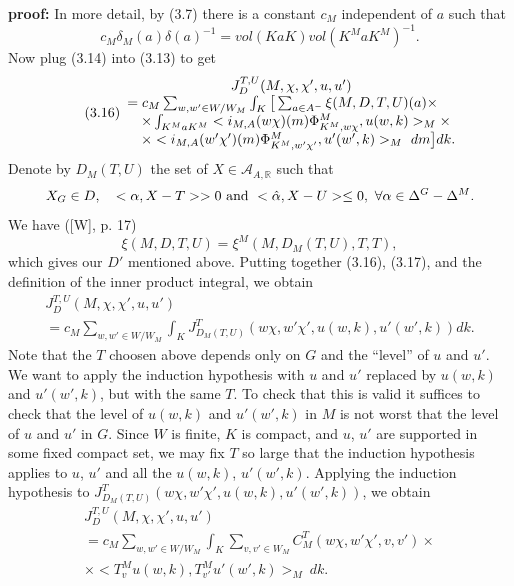 \documentclass[12pt]{article}
\newenvironment{pf}[1][proof:]{\par\medskip\noindent\textbf{#1} }{\par\medskip}
\begin{document}
\begin{pf}
In more detail, by (3.7) there is a constant $c_M$ independent of $a$ such that
\[
c_M\delta_M(a)\delta(a)^{-1}=vol(KaK)vol(K^MaK^M)^{-1}.
\]
Now plug (3.14) into (3.13) to get
\begin{equation}\tag{3.16}
\begin{array}{l}
\multicolumn{1}{c}{J^{T,U}_D(M,\chi,\chi',u,u')}\\
=c_M\sum_{w,w'\in W/W_M}\int_K\big[\sum_{a\in A^-}\xi(M,D,T,U)(a)\times\\
\quad\times\int_{K^MaK^M}<i_{M,A}(w\chi)(m)\Phi^M_{K^M,w\chi},u(w,k)>_M\times\\
\quad\times<i_{M,A}(w'\chi')(m)\Phi^M_{K^M,w'\chi'},u'(w',k)>_M\ dm\big]dk.
\end{array}
\end{equation}
Denote by $D_M(T,U)$ the set of $X\in\mathcal{A}_{A,\mathbb{R}}$ such that
\[
X_G\in D,\quad<\alpha,X-T>>0\ {\rm and}\ <\hat\alpha,X-U>\leq0,\ \forall\alpha\in\Delta^G-\Delta^M.
\]
We have ([W], p. 17)
\begin{equation}\tag{3.17}
\xi(M,D,T,U)=\xi^M(M,D_M(T,U),T,T),
\end{equation}
which gives our $D'$ mentioned above. Putting together (3.16), (3.17), and the definition of the inner product integral, we obtain
\[
\begin{array}{c}
J^{T,U}_D(M,\chi,\chi',u,u')\\
=c_M\sum_{w,w'\in W/W_M}\int_KJ^T_{D_M(T,U)}(w\chi,w'\chi',u(w,k),u'(w',k))dk.
\end{array}
\]
Note that the $T$ choosen above depends only on $G$ and the ``level'' of $u$ and $u'$. We want to apply the induction hypothesis with $u$ and $u'$ replaced by $u(w,k)$ and $u'(w',k)$, but with the same $T$. To check that this is valid it suffices to check that the level of $u(w,k)$ and $u'(w',k)$ in $M$ is not worst that the level of $u$ and $u'$ in $G$. Since $W$ is finite, $K$ is compact, and $u$, $u'$ are supported in some fixed compact set, we may fix $T$ so large that the induction hypothesis applies to $u$, $u'$ and all the $u(w,k)$, $u'(w',k)$. Applying the induction hypothesis to $J^T_{D_M(T,U)}(w\chi,w'\chi',u(w,k),u'(w',k))$, we obtain
\begin{equation}\tag{3.18}
\begin{array}{c}
J^{T,U}_D(M,\chi,\chi',u,u')\\
=c_M\sum_{w,w'\in W/W_M}\int_K\sum_{v,v'\in W_M}C^T_M(w\chi,w'\chi',v,v')\times\\
\times<T^M_vu(w,k),T^M_{v'}u'(w',k)>_M\ dk.
\end{array}

\end{equation}
\end{pf}
\end{document}
